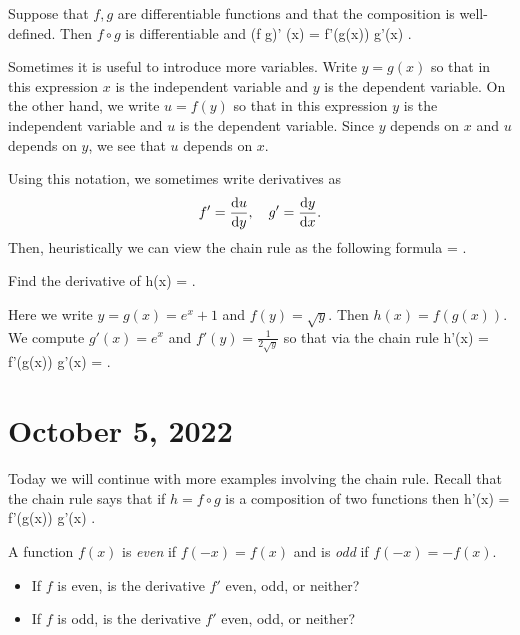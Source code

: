 \documentclass[11pt]{amsart}
\begin{document}
\begin{thm}
Suppose that $f,g$ are differentiable functions and that the composition is well-defined. 
Then $f \circ g$ is differentiable and 
\beqn
(f \circ g)' (x) = f'(g(x)) \cdot g'(x) .
\eeqn 
\end{thm}

Sometimes it is useful to introduce more variables.
Write $y = g(x)$ so that in this expression $x$ is the independent variable and $y$ is the dependent variable. 
On the other hand, we write $u = f(y)$ so that in this expression $y$ is the independent variable and $u$ is the dependent variable. 
Since $y$ depends on $x$ and $u$ depends on $y$, we see that $u$ depends on $x$.

Using this notation, we sometimes write derivatives as 
\[
f' = \frac{{\rm d} u}{{\rm d} y} , \quad g' = \frac{{\rm d} y}{{\rm d} x} .
\]
Then, heuristically we can view the chain rule as the following formula
\beqn
{} =   .
\eeqn

\newpage

\begin{eg} Find the derivative of 
\beqn
h(x) =  .
\eeqn

\vspace{1cm}

Here we write $y = g(x) = e^{x} + 1$ and $f(y) = \sqrt{y}$. 
Then $h(x) = f(g(x))$. 
We compute $g'(x) = e^x$ and $f'(y) = \frac{1}{2 \sqrt{y}}$ so that via the chain rule
\beqn
h'(x) = f'(g(x)) g'(x) = .
\eeqn 
\end{eg}

\newpage

\section*{October 5, 2022}

Today we will continue with more examples involving the chain rule.
Recall that the chain rule says that if $h = f \circ g$ is a composition of two functions then
\beqn
h'(x) = f'(g(x)) \cdot g'(x) .
\eeqn  

\begin{eg}
A function $f(x)$ is {\em even} if $f(-x) = f(x)$ and is {\em odd} if $f(-x) = -f(x)$. 
\begin{itemize} 
\item If $f$ is even, is the derivative $f'$ even, odd, or neither? 
\item If $f$ is odd, is the derivative $f'$ even, odd, or neither? 
\end{itemize} 
\end{eg}
\end{document}
